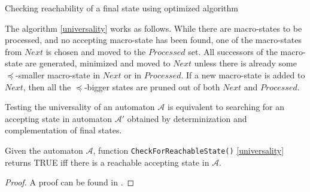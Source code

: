 \begin{algorithm}[ht!]
		\BlankLine
		\BlankLine
		\caption{Checking reachability of a
		final state using optimized algorithm\cite{tacas}}\label{universality}
	\end{algorithm}
	
The algorithm \ref{universality} works as follows. While there are macro-states
to be processed, and no accepting macro-state has been found, one of the macro-states from $Next$
is chosen and moved to the $Processed$ set. All successors of the macro-state are
generated, minimized and moved to $Next$ unless there is already some
$\preceq$-smaller macro-state in $Next$ or in $Processed$. If a
new macro-state is added to $Next$, then all the
$\preceq$-bigger states are pruned out of both $Next$ and
$Processed$.

Testing the universality of an automaton $\mathcal{A}$ is equivalent to
searching for an accepting state in automaton $\mathcal{A}'$ obtained by
determinization and complementation of final states.
	
\begin{lemma}\label{search-is-correct}
 Given the automaton $\mathcal{A}$, function \texttt{CheckForReachableState()}
 \ref{universality} returns \textsc{TRUE} iff there is a reachable accepting
 state in $\mathcal{A}$.
\end{lemma}
\begin{proof}
 A proof can be found in \cite{raskin}.
\end{proof}

